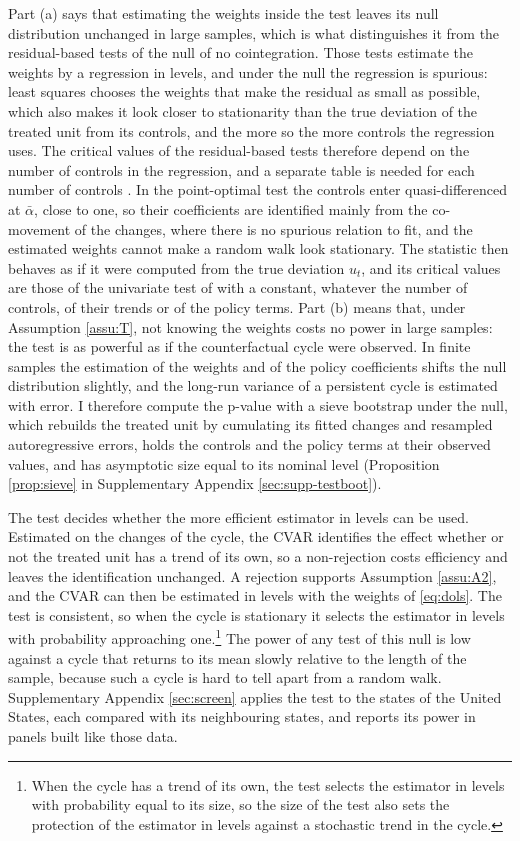 \documentclass[12pt,a4paper]{article}
\theoremstyle{definition}
\theoremstyle{definition}\newtheorem{example}{Example}
\theoremstyle{definition}\newtheorem{definition}{Definition}
\begin{document}
Part (a) says that estimating the weights inside the test leaves its null distribution unchanged in large samples, which is what distinguishes it from the residual-based tests of the null of no cointegration. Those tests estimate the weights by a regression in levels, and under the null the regression is spurious: least squares chooses the weights that make the residual as small as possible, which also makes it look closer to stationarity than the true deviation of the treated unit from its controls, and the more so the more controls the regression uses. The critical values of the residual-based tests therefore depend on the number of controls in the regression, and a separate table is needed for each number of controls \citep{PhillipsOuliaris1990,PerronRodriguez2016}. In the point-optimal test the controls enter quasi-differenced at $\bar\alpha$, close to one, so their coefficients are identified mainly from the co-movement of the changes, where there is no spurious relation to fit, and the estimated weights cannot make a random walk look stationary. The statistic then behaves as if it were computed from the true deviation $u_t$, and its critical values are those of the univariate test of \citet{ERS1996} with a constant, whatever the number of controls, of their trends or of the policy terms. Part (b) means that, under Assumption \ref{assu:T}, not knowing the weights costs no power in large samples: the test is as powerful as if the counterfactual cycle were observed. In finite samples the estimation of the weights and of the policy coefficients shifts the null distribution slightly, and the long-run variance of a persistent cycle is estimated with error. I therefore compute the p-value with a sieve bootstrap under the null, which rebuilds the treated unit by cumulating its fitted changes and resampled autoregressive errors, holds the controls and the policy terms at their observed values, and has asymptotic size equal to its nominal level (Proposition \ref{prop:sieve} in Supplementary Appendix \ref{sec:supp-testboot}).



The test decides whether the more efficient estimator in levels can be used. Estimated on the changes of the cycle, the CVAR identifies the effect whether or not the treated unit has a trend of its own, so a non-rejection costs efficiency and leaves the identification unchanged. A rejection supports Assumption \ref{assu:A2}, and the CVAR can then be estimated in levels with the weights of \eqref{eq:dols}. The test is consistent, so when the cycle is stationary it selects the estimator in levels with probability approaching one.\footnote{When the cycle has a trend of its own, the test selects the estimator in levels with probability equal to its size, so the size of the test also sets the protection of the estimator in levels against a stochastic trend in the cycle.} The power of any test of this null is low against a cycle that returns to its mean slowly relative to the length of the sample, because such a cycle is hard to tell apart from a random walk. Supplementary Appendix \ref{sec:screen} applies the test to the states of the United States, each compared with its neighbouring states, and reports its power in panels built like those data.
\end{document}
